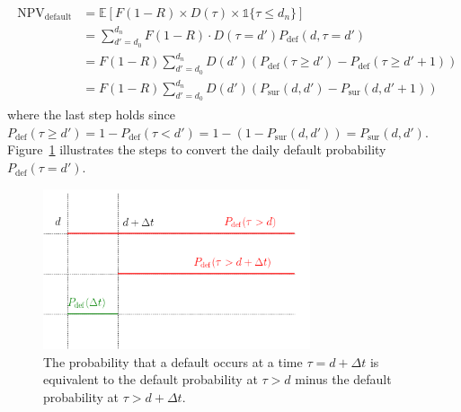 \begin{align}
\begin{split}
\mathrm{NPV_{default}} &= \mathbb{E}[F(1-R) \times D(\tau) \times \mathbb{1}\{\tau \leq d_n\} ] \\
&= \sum_{d'=d_0}^{d_n} F(1-R) \cdot D(\tau = d') P_{\textrm{def}}(d, \tau = d') \\
&= F(1-R) \sum_{d'=d_0}^{d_n} D(d') \left(P_{\textrm{def}}(\tau \geq d') - P_{\textrm{def}}( \tau \geq d'+1) \right) \\
&= F(1-R) \sum_{d'=d_0}^{d_n} D(d') \left( P_{\textrm{sur}}(d, d') - P_{\textrm{sur}}(d, d'+1) \right)
\end{split}
\end{align}
where the last step holds since $P_{\textrm{def}}(\tau\geq d') = 1 - P_{\textrm{def}}(\tau < d') = 1 - (1-P_{\textrm{sur}}(d, d')) = P_{\textrm{sur}}(d, d')$. 
Figure~\ref{fig:default_p} illustrates the steps to convert the daily default probability $P_{\textrm{def}}(\tau=d')$.

\begin{figure}[htb]
\centering
\includegraphics[width=0.7\textwidth]{figures/timeline.png}
\caption{The probability that a default occurs at a time $\tau = d+\Delta t$ is equivalent to the default probability at $\tau > d$ minus the default probability at $\tau>d+\Delta t$.}
\label{fig:default_p}
\end{figure}

